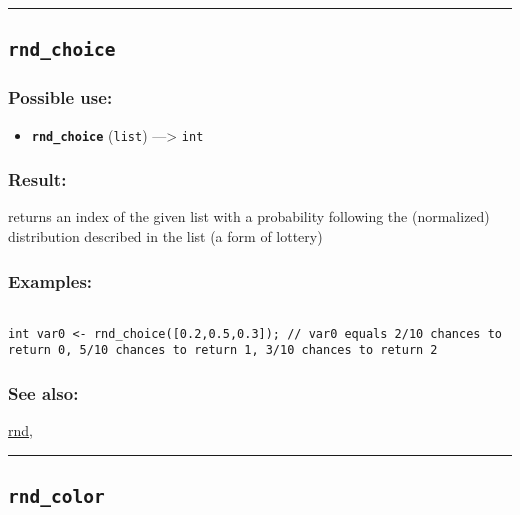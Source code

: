 \documentclass[]{book}
\providecommand{\tightlist}{%
  \setlength{\itemsep}{0pt}\setlength{\parskip}{0pt}}
\theoremstyle{definition}
\theoremstyle{definition}
\theoremstyle{definition}
\theoremstyle{remark}
\begin{document}
\begin{center}\rule{0.5\linewidth}{\linethickness}\end{center}

\subsection{\texorpdfstring{\texttt{rnd\_choice}}{rnd\_choice}}\label{rnd_choice}

\subsubsection{Possible use:}\label{possible-use-442}

\begin{itemize}
\tightlist
\item
  \textbf{\texttt{rnd\_choice}} (\texttt{list}) ---\textgreater{}
  \texttt{int}
\end{itemize}

\subsubsection{Result:}\label{result-428}

returns an index of the given list with a probability following the
(normalized) distribution described in the list (a form of lottery)

\subsubsection{Examples:}\label{examples-303}

\begin{verbatim}
 
int var0 <- rnd_choice([0.2,0.5,0.3]); // var0 equals 2/10 chances to return 0, 5/10 chances to return 1, 3/10 chances to return 2
\end{verbatim}

\subsubsection{See also:}\label{see-also-177}

\href{OperatorsNR\#rnd}{rnd},

\begin{center}\rule{0.5\linewidth}{\linethickness}\end{center}

\subsection{\texorpdfstring{\texttt{rnd\_color}}{rnd\_color}}\label{rnd_color}
\end{document}

